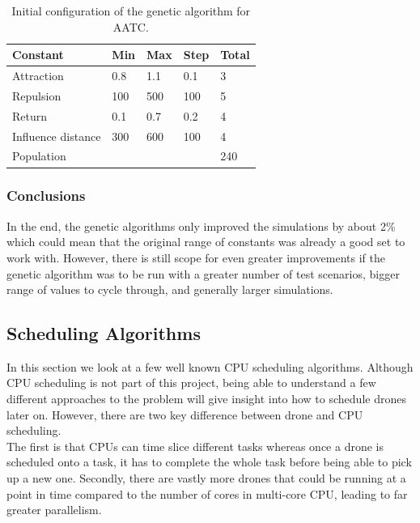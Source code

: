 \documentclass[a4paper,12pt,titlepage]{article}
\begin{document}
\begin{table}[!hbpt]
\centering
\begin{tabular}{|l|l|l|l|l|}
\hline
Constant           & Min & Max & Step & Total \\ \hline
Attraction         & 0.8 & 1.1 & 0.1    & 3     \\ \hline
Repulsion          & 100 & 500 & 100  & 5     \\ \hline
Return             & 0.1 & 0.7 & 0.2  & 4     \\ \hline
Influence distance & 300 & 600 & 100  & 4     \\ \hline
\multicolumn{4}{|l|}{Population}      & 240   \\ \hline
\end{tabular}
\caption{Initial configuration of the genetic algorithm for AATC. \cite{Balaji2017}}
\label{tab:gen_alg}
\end{table}

\subsubsection{Conclusions}
In the end, the genetic algorithms only improved the simulations by about 2\%\cite{Balaji2017} which could mean that the original range of constants was already a good set to work with. However, there is still scope for even greater improvements if the genetic algorithm was to be run with a greater number of test scenarios, bigger range of values to cycle through, and generally larger simulations.

\subsection{Scheduling Algorithms}
In this section we look at a few well known CPU scheduling algorithms\cite{Bell2018}. Although CPU scheduling is not part of this project, being able to understand a few different approaches to the problem will give insight into how to schedule drones later on. However, there are two key difference between drone and CPU scheduling.\\

The first is that CPUs can time slice different tasks whereas once a drone is scheduled onto a task, it has to complete the whole task before being able to pick up a new one. Secondly, there are vastly more drones that could be running at a point in time compared to the number of cores in multi-core CPU, leading to far greater parallelism.
\end{document}
